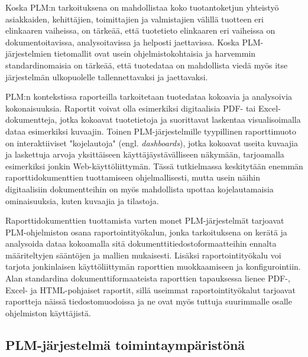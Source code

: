 Koska PLM:n tarkoituksena on mahdollistaa koko tuotantoketjun yhteistyö asiakkaiden, kehittäjien, toimittajien ja valmistajien välillä tuotteen eri elinkaaren vaiheissa, \cite{bouhaddou_plm_2012} on tärkeää, että tuotetieto elinkaaren eri vaiheissa on dokumentoitavissa, analysoitavissa ja helposti jaettavissa. Koska PLM-järjestelmien tietomallit ovat usein ohjelmistokohtaisia ja harvemmin standardinomaisia\cite{SritiMohamed-Foued2012PTaS} on tärkeää, että tuotedataa on mahdollista viedä myös itse järjestelmän ulkopuolelle tallennettavaksi ja jaettavaksi.

PLM:n kontekstissa raporteilla tarkoitetaan tuotedataa kokoavia ja analysoivia kokonaisuuksia. Raportit voivat olla esimerkiksi digitaalisia PDF- tai Excel-dokumentteja, jotka kokoavat tuotetietoja ja suorittavat laskentaa visualisoimalla dataa esimerkiksi kuvaajin. Toinen PLM-järjestelmille tyypillinen raporttimuoto on interaktiiviset "kojelautoja" (engl. \textit{dashboards}), jotka kokoavat useita kuvaajia ja laskettuja arvoja yksittäiseen käyttäjäystävälliseen näkymään, tarjoamalla esimerkiksi jonkin Web-käyttöliittymän. Tässä tutkielmassa keskitytään enemmän raporttidokumenttien tuottamiseen ohjelmallisesti, mutta usein näihin digitaalisiin dokumentteihin on myös mahdollista upottaa kojelautamaisia ominaisuuksia, kuten kuvaajia ja tilastoja.

Raporttidokumenttien tuottamista varten monet PLM-järjestelmät tarjoavat PLM-ohjelmiston osana raportointityökalun, jonka tarkoituksena on kerätä ja analysoida dataa kokoamalla sitä dokumenttitiedostoformaatteihin ennalta määriteltyjen sääntöjen ja mallien mukaisesti. Lisäksi raportointityökalu voi tarjota jonkinlaisen käyttöliittymän raporttien muokkaamiseen ja konfigurointiin. Alan standardina dokumenttiformaateista raporttien tapauksessa lienee PDF-, Excel- ja HTML-pohjaiset raportit, sillä useimmat raportointityökalut tarjoavat raportteja näissä tiedostomuodoissa ja ne ovat myös tuttuja suurimmalle osalle ohjelmiston käyttäjistä. 

\subsection{PLM-järjestelmä toimintaympäristönä} \label{PLM-järjestelmä toimintaympäristönä}

